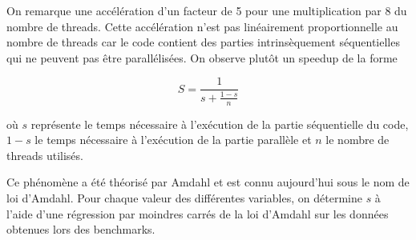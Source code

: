 \documentclass[a4paper, 10pt, twoside]{article}
\begin{document}
On remarque une accélération d'un facteur de 5 pour une multiplication par 8 du nombre de threads. Cette accélération n'est pas linéairement proportionnelle au nombre de threads car le code contient des parties intrinsèquement séquentielles qui ne peuvent pas être parallélisées. On observe plutôt un speedup de la forme

$$ S = \frac{1}{s + \frac{1-s}{n}} $$

où $s$ représente le temps nécessaire à l'exécution de la partie séquentielle du code, $1-s$ le temps nécessaire à l'exécution de la partie parallèle et $n$ le nombre de threads utilisés.

Ce phénomène a été théorisé par Amdahl \cite{amdahl2007validity} et est connu aujourd'hui sous le nom de loi d'Amdahl.
Pour chaque valeur des différentes variables, on détermine $s$ à l'aide d'une régression par moindres carrés de la loi d'Amdahl sur les données obtenues lors des benchmarks.
\end{document}
